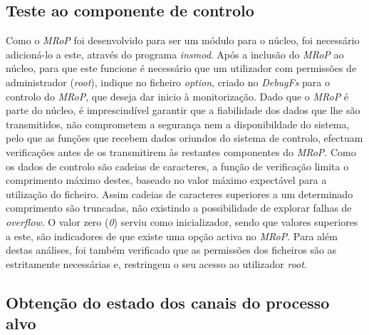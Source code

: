 \subsection{Teste ao componente de controlo}

Como o \textit{MRoP} foi desenvolvido para ser um módulo para o núcleo, foi necessário adicioná-lo a este, através do programa \textit{insmod}.
Após a inclusão do \textit{MRoP} ao núcleo, para que este funcione é necessário que um utilizador com permissões de administrador (\textit{root}), indique no ficheiro \textit{option}, criado no \textit{DebugFs} para o controlo do \textit{MRoP}, que deseja dar inicio à monitorização.
Dado que o \textit{MRoP} é parte do núcleo, é imprescindível garantir que a fiabilidade dos dados que lhe são transmitidos, não comprometem a segurança nem a disponibildade do sistema, pelo que as funções que recebem dados oriundos do sistema de controlo, efectuam verificações antes de os transmitirem às restantes componentes do \textit{MRoP}.
Como os dados de controlo são cadeias de caracteres, a função de verificação limita o comprimento máximo destes, baseado no valor máximo expectável para a utilização do ficheiro.
Assim cadeias de caracteres superiores a um determinado comprimento são truncadas, não existindo a possibilidade de explorar falhas de \textit{overflow}.
O valor zero (\textit{0}) serviu como inicializador, sendo que valores superiores a este, são indicadores de que existe uma opção activa no \textit{MRoP}.
Para além destas análises, foi também verificado que as permissões dos ficheiros são as estritamente necessárias e, restringem o seu acesso ao utilizador \textit{root}.

\subsection{Obtenção do estado dos canais do processo alvo}

